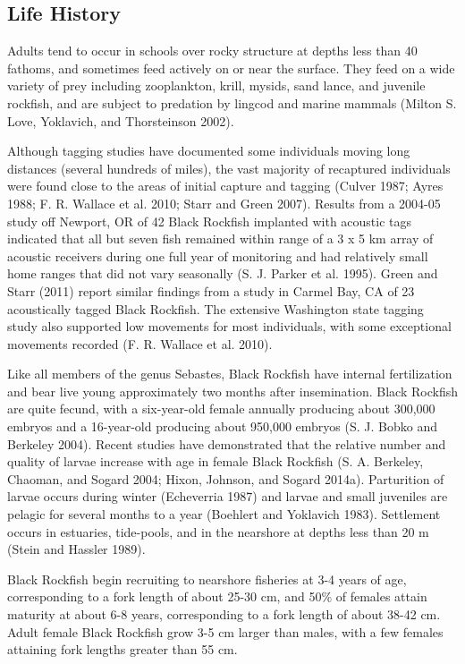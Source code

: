 \documentclass[11pt,
  english,
  letterpaper,
]{article}
\begin{document}
\hypertarget{life-history}{%
\subsection{Life History}\label{life-history}}

Adults tend to occur in schools over rocky structure at depths less than 40 fathoms, and sometimes feed actively on or near the surface. They feed on a wide variety of prey including zooplankton, krill, mysids, sand lance, and juvenile rockfish, and are subject to predation by lingcod and marine mammals (Milton S. Love, Yoklavich, and Thorsteinson 2002).

Although tagging studies have documented some individuals moving long distances (several hundreds of miles), the vast majority of recaptured individuals were found close to the areas of initial capture and tagging (Culver 1987; Ayres 1988; F. R. Wallace et al. 2010; Starr and Green 2007). Results from a 2004-05 study off Newport, OR of 42 Black Rockfish implanted with acoustic tags indicated that all but seven fish remained within range of a 3 x 5 km array of acoustic receivers during one full year of monitoring and had relatively small home ranges that did not vary seasonally (S. J. Parker et al. 1995). Green and Starr (2011) report similar findings from a study in Carmel Bay, CA of 23 acoustically tagged Black Rockfish. The extensive Washington state tagging study also supported low movements for most individuals, with some exceptional movements recorded (F. R. Wallace et al. 2010).

Like all members of the genus Sebastes, Black Rockfish have internal fertilization and bear live young approximately two months after insemination. Black Rockfish are quite fecund, with a six-year-old female annually producing about 300,000 embryos and a 16-year-old producing about 950,000 embryos (S. J. Bobko and Berkeley 2004). Recent studies have demonstrated that the relative number and quality of larvae increase with age in female Black Rockfish (S. A. Berkeley, Chaoman, and Sogard 2004; Hixon, Johnson, and Sogard 2014a). Parturition of larvae occurs during winter (Echeverria 1987) and larvae and small juveniles are pelagic for several months to a year (Boehlert and Yoklavich 1983). Settlement occurs in estuaries, tide-pools, and in the nearshore at depths less than 20 m (Stein and Hassler 1989).

Black Rockfish begin recruiting to nearshore fisheries at 3-4 years of age, corresponding to a fork length of about 25-30 cm, and 50\% of females attain maturity at about 6-8 years, corresponding to a fork length of about 38-42 cm. Adult female Black Rockfish grow 3-5 cm larger than males, with a few females attaining fork lengths greater than 55 cm.
\end{document}
